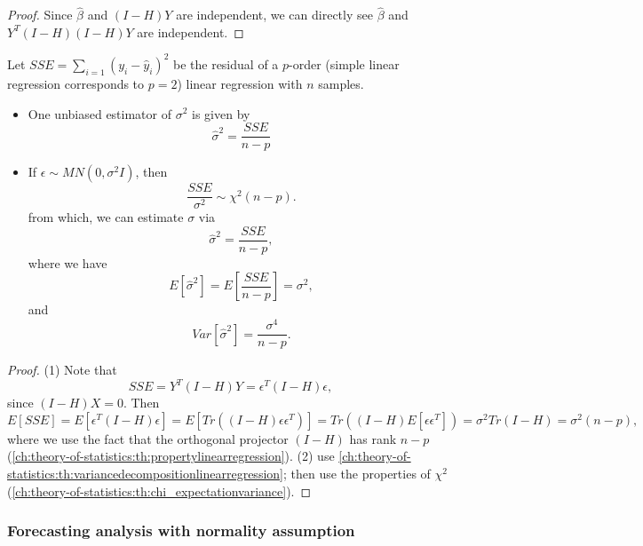 \begin{refsection}
\begin{proof}
	Since $\hat{\beta}$ and $(I-H)Y$ are independent, we can directly see
	$\hat{\beta}$ and $Y^T(I-H)(I-H)Y$ are independent.
\end{proof}

\begin{theorem}\label{ch:statistical-models:th:residualAndEstimationVarianceLinearRegression}\cite[114]{theil1971principles}
	Let $SSE = \sum_{i=1} (y_i - \hat{y}_i)^2$ be the residual of a $p$-order (simple linear regression corresponds to $p = 2$) linear regression with $n$ samples.
\begin{itemize}
	\item One unbiased estimator of $\sigma^2$ is given by
	$$\hat{\sigma}^2 = \frac{SSE}{n-p}$$
	\item If $\epsilon \sim MN(0,\sigma^2 I)$,  then
	$$\frac{SSE}{\sigma^2} \sim \chi^2(n-p).$$
	from which, we can estimate $\sigma$ via
	$$\hat{\sigma}^2 = \frac{SSE}{n-p},$$
	where we have 
	$$ E[\hat{\sigma}^2] = E[\frac{SSE}{n-p}] = \sigma^2,$$
	and
	$$ Var[\hat{\sigma}^2] =  \frac{\sigma^4}{n-p}.$$
		
\end{itemize}	
\end{theorem}

\begin{proof}
(1)
Note that
$$SSE = Y^T(I-H)Y = \epsilon^T (I-H)\epsilon,$$
since $(I-H)X = 0$.
Then
$$E[SSE] = E[\epsilon^T (I-H)\epsilon] = E[Tr((I-H)\epsilon\epsilon^T)] = Tr((I-H)E[\epsilon\epsilon^T]) = \sigma^2 Tr(I-H) = \sigma^2 (n-p),$$
where we use the fact that the orthogonal projector $(I-H)$ has rank $n-p$ (\autoref{ch:theory-of-statistics:th:propertylinearregression}).
	(2) use \autoref{ch:theory-of-statistics:th:variancedecompositionlinearregression};
	then use the properties of $\chi^2$ (\autoref{ch:theory-of-statistics:th:chi_expectationvariance}).
\end{proof}



\subsubsection{Forecasting analysis with normality assumption}



\end{refsection}
